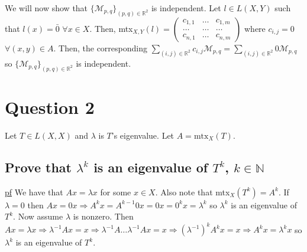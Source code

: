 \documentclass[11pt]{article} %
\begin{document}
We will now show that $\{ \mathcal{M}_{p,q} \}_{(p,q) \in \mathbb{R}^2}$ is independent. Let $l \in L(X,Y)$ such that $l(x) = \bar{0}$ $\forall x \in X.$ Then, mtx$_{X,Y}(l) = \begin{pmatrix}c_{1,1} & \dots  & c_{1,m} \\ \dots & \dots & \dots \\ c_{n,1} & \dots  & c_{n,m} \end{pmatrix}$ where $c_{i,j} = 0$ $\forall (x,y) \in A.$ Then, the corresponding $\sum_{(i,j) \in \mathbb{R}^2} c_{i,j}\mathcal{M}_{p,q} = \sum_{(i,j) \in \mathbb{R}^2} 0 \mathcal{M}_{p,q}$ so $\{ \mathcal{M}_{p,q} \}_{(p,q) \in \mathbb{R}^2}$ is independent.
%
%

\section{Question 2}
Let $T \in L(X,X)$ and $\lambda$ is $T$'s eigenvalue. Let $A = \text{mtx}_X(T)$. 

\subsection{Prove that $\lambda^k$ is an eigenvalue of $T^k$, $k \in \mathbb{N}$}
\underline{pf} We have that $Ax = \lambda x$ for some $x \in X$. Also note that mtx$_X(T^k) = A^k.$ If $\lambda = 0$ then $Ax = 0x \Rightarrow A^kx = A^{k-1}0x = 0x = 0^{k}x = \lambda^{k}$ so $\lambda^{k}$ is an eigenvalue of $T^k$. Now assume $\lambda$ is nonzero. Then $Ax = \lambda x \Rightarrow \lambda^{-1} Ax = x \Rightarrow \lambda^{-1}A \dots \lambda^{-1} A x = x \Rightarrow (\lambda^{-1})^k A^k x = x \Rightarrow A^k x = \lambda^k x$ so $\lambda^k$ is an eigenvalue of $T^k$.
\end{document}
